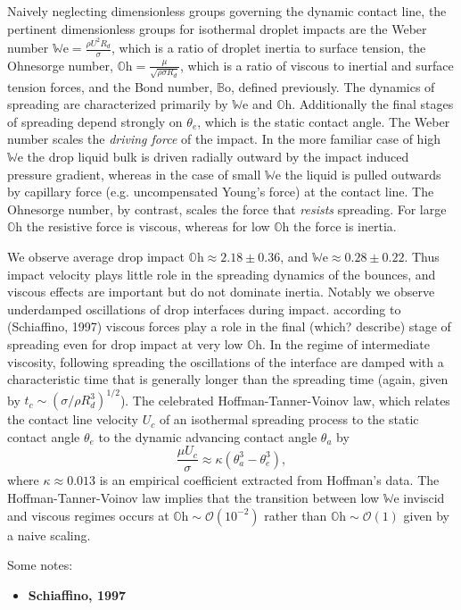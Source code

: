 \documentclass[10pt,a4paper]{article}
\begin{document}
Naively neglecting dimensionless groups governing the dynamic contact line, the pertinent dimensionless groups for isothermal droplet impacts are the Weber number $\mathbb{W}\mbox{e} = \frac{\rho U^2 R_d}{\sigma}$, which is a ratio of droplet inertia to surface tension, the Ohnesorge number, $\mathbb{O}\mbox{h} = \frac{\mu}{\sqrt{\rho \sigma R_d}}$, which is a ratio of viscous to inertial and surface tension forces, and the Bond number, $\mathbb{B}\mbox{o}$, defined previously. The dynamics of spreading are characterized primarily by $\mathbb{W}\mbox{e}$ and $\mathbb{O}\mbox{h}$. Additionally the final stages of spreading depend strongly on $\theta_e$, which is the static contact angle. The Weber number scales the \emph{driving force} of the impact. In the more familiar case of high $\mathbb{W}\mbox{e}$ the drop liquid bulk is driven radially outward by the impact induced pressure gradient, whereas in the case of small $\mathbb{W}\mbox{e}$ the liquid is pulled outwards by capillary force (e.g. uncompensated Young's force) at the contact line. The Ohnesorge number, by contrast, scales the force that \emph{resists} spreading. For large $\mathbb{O}\mbox{h}$ the resistive force is viscous, whereas for low $\mathbb{O}\mbox{h}$ the force is inertia.

We observe average drop impact $\mathbb{O}\mbox{h} \approx 2.18 \pm 0.36$, and  $\mathbb{W}\mbox{e} \approx 0.28 \pm 0.22$. Thus impact velocity plays little role in the spreading dynamics of the bounces, and viscous effects are important but do not dominate inertia. Notably we observe underdamped oscillations of drop interfaces during impact. according to (Schiaffino, 1997) viscous forces play a role in the final (which? describe) stage of spreading even for drop impact at very low $\mathbb{O}\mbox{h}$. In the regime of intermediate viscosity, following spreading the oscillations of the interface are damped with a characteristic time that is generally longer than the spreading time (again, given by $t_c \sim \left( \sigma / \rho R_d^3 \right)^{1/2}$). The celebrated Hoffman-Tanner-Voinov law, which relates the contact line velocity $U_c$ of an isothermal spreading process to the static contact angle $\theta_e$ to the dynamic advancing contact angle $\theta_a$ by
\[
\frac{\mu U_c}{\sigma} \approx \kappa \left( \theta_a^3 - \theta_e^3 \right),
\]
where $\kappa \approx 0.013$ is an empirical coefficient extracted from Hoffman's data. The Hoffman-Tanner-Voinov law implies that the transition between low $\mathbb{W}\mbox{e}$ inviscid and viscous regimes occurs at $\mathbb{O}\mbox{h} \sim \mathcal{O}(10^{-2})$ rather than $\mathbb{O}\mbox{h} \sim \mathcal{O}(1)$ given by a naive scaling.

Some notes:
\begin{itemize}
\item{\textbf{Schiaffino, 1997}} 
\end{itemize}

\end{document}
